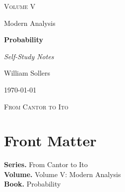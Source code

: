 \documentclass[12pt, a4paper]{report}
\begin{document}
\ExplSyntaxOff
\renewcommand{\familydefault}{\rmdefault}

\begin{titlepage}
\centering
\vspace*{3.5cm}

{\Large\scshape Volume V\par}
\vspace{0.35cm}
{\large Modern Analysis\par}

\vspace{1.4cm}

{\Huge\bfseries Probability\par}

\vspace{0.6cm}
{\large\itshape Self-Study Notes\par}

\vfill

{\large William Sollers\par}
\vspace{0.35cm}
{\large \today\par}

\vfill

{\large\scshape From Cantor to Ito\par}
\end{titlepage}

\clearpage
\thispagestyle{plain}
\chapter*{Front Matter}
\noindent\textbf{Series.} From Cantor to Ito\\[0.5em]
\textbf{Volume.} Volume V: Modern Analysis\\[0.5em]
\textbf{Book.} Probability

\clearpage
\tableofcontents
\clearpage
{}



\clearpage



\printindex[tech]
\printindex[dep]
\end{document}
